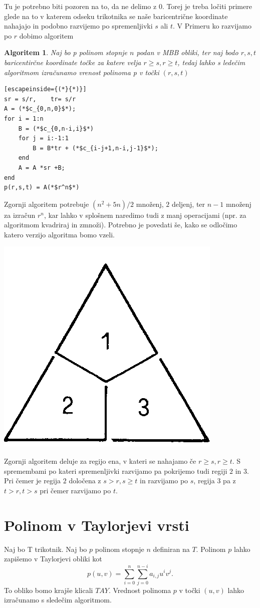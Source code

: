 \documentclass{article}
\newtheorem{algoritm}{Algoritem}[section]
\begin{document}
Tu je potrebno biti pozoren na to, da ne delimo z $0$. Torej je treba ločiti primere glede na to v katerem odseku trikotnika se naše baricentrične koordinate nahajajo in podobno razvijemo po spremenljivki $s$ ali $t$.
V Primeru ko razvijamo po $r$ dobimo algoritem

\begin{algoritm}
Naj bo p polinom stopnje $n$ podan v MBB obliki, ter naj bodo $ r,s,t$ baricentirčne koordinate točke za katere velja $r \geq s,r \geq t$, tedaj lahko s ledečim algoritmom izračunamo vrenost polinoma p v točki $(r,s,t)$
\begin{lstlisting}[escapeinside={(*}{*)}]
sr = s/r,	 tr= s/r
A = (*$c_{0,n,0}$*);
for i = 1:n
    B = (*$c_{0,n-i,i}$*)
    for j = i:-1:1
        B = B*tr + (*$c_{i-j+1,n-i,j-1}$*);
    end
    A = A *sr +B;
end
p(r,s,t) = A(*$r^n$*)
\end{lstlisting}
\end{algoritm}

Zgornji algoritem potrebuje $(n^2+5n)/2$ množenj, $2$ deljenj, ter $n-1$ množenj za izračun $r^n$, kar lahko v splošnem naredimo tudi z manj operacijami (npr. za algoritmom kvadriraj in zmnoži).
Potrebno je povedati še, kako se odločimo katero verzijo algoritma bomo vzeli.

\begin{center}
\includegraphics[width=.3\linewidth]{graf1.png}
\end{center}

Zgornji algoritem deluje za regijo ena, v kateri se nahajamo če $r \geq s,r \geq t$. S spremembami po kateri spremenljivki razvijamo pa pokrijemo tudi regiji $2$ in $3$. Pri čemer je regija $2$ določena z $s > r, s \geq t$ in razvijamo po $s$, regija 3 pa z $t > r, t>s$ pri čemer razvijamo po $t$.


\section{Polinom v Taylorjevi vrsti}

Naj bo T trikotnik. Naj bo $p$ polinom stopnje $n$ definiran na $T$. Polinom $p$ lahko zapišemo v Taylorjevi obliki kot 
$$p(u,v) = \sum_{i = 0}^n{\sum_{j=0}^{n-i}{a_{i,j}u^iv^j }}.$$To obliko bomo krajše klicali $TAY$.  Vrednost polinoma $p$ v točki $(u,v)$ lahko izračunamo s sledečim algoritmom.
\end{document}
